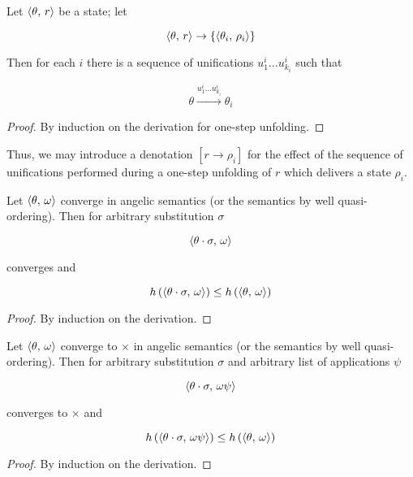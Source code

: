 \begin{lemma}
\label{lem:one-step-unfolding}

Let $\langle \theta,\,r \rangle$ be a state; let

\[
\langle \theta,\,r \rangle\to\{\langle \theta_i,\,\rho_i \rangle\}
\]

Then for each $i$ there is a sequence of unifications $u^i_1\dots u^i_{k_i}$ such that

\[
\theta\xrightarrow{u^i_1\dots u^i_{k_i}}{\theta_i}
\]
\end{lemma}
\begin{proof}
By induction on the derivation for one-step unfolding.
\end{proof}

Thus, we may introduce a denotation $[r\to\rho_i]$ for the effect of the sequence of unifications performed during a one-step unfolding of $r$ which
delivers a state $\rho_i$. 

\begin{lemma}[Weakening]
  \label{lem:weakening}

  Let $\langle \theta,\,\omega \rangle$ converge in angelic semantics (or the semantics by well quasi-ordering). Then for arbitrary substitution $\sigma$ 

  \[
  \langle \theta\cdot\sigma,\,\omega \rangle
  \]

  converges and

  \[
  h\,(\langle \theta\cdot\sigma,\,\omega \rangle)\le h\,(\langle \theta,\,\omega \rangle)
  \]
  
\end{lemma}
\begin{proof}
  By induction on the derivation.
\end{proof}

\begin{lemma}
  \label{lem:weakening-contradiciton}

  Let $\langle \theta,\,\omega \rangle$ converge to $\times$ in angelic semantics (or the semantics by well quasi-ordering). Then for arbitrary substitution $\sigma$ and
  arbitrary list of applications $\psi$

  \[
  \langle \theta\cdot\sigma,\,\omega\psi \rangle
  \]

  converges to $\times$ and

  \[
  h\,(\langle \theta\cdot\sigma,\,\omega\psi \rangle)\le h\,(\langle \theta,\,\omega \rangle)
  \]
  
\end{lemma}
\begin{proof}
  By induction on the derivation.
\end{proof}

